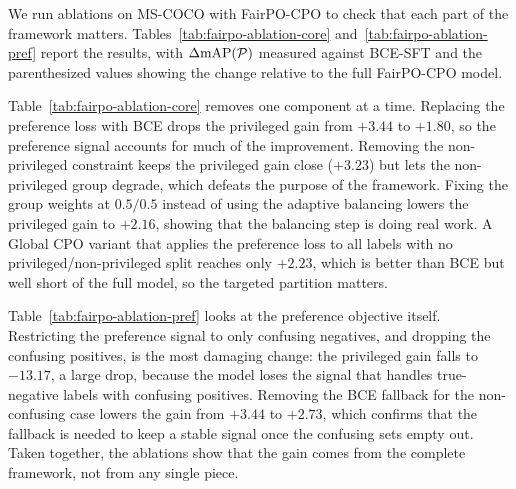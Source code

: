 We run ablations on MS-COCO with FairPO-CPO to check that each part of the framework
matters. Tables~\ref{tab:fairpo-ablation-core} and~\ref{tab:fairpo-ablation-pref}
report the results, with $\Delta\text{mAP}(\mathcal{P})$ measured against BCE-SFT and
the parenthesized values showing the change relative to the full FairPO-CPO model.

Table~\ref{tab:fairpo-ablation-core} removes one component at a time. Replacing the
preference loss with BCE drops the privileged gain from $+3.44$ to $+1.80$, so the
preference signal accounts for much of the improvement. Removing the non-privileged
constraint keeps the privileged gain close ($+3.23$) but lets the non-privileged
group degrade, which defeats the purpose of the framework. Fixing the group weights
at $0.5/0.5$ instead of using the adaptive balancing lowers the privileged gain to
$+2.16$, showing that the balancing step is doing real work. A Global CPO variant
that applies the preference loss to all labels with no privileged/non-privileged
split reaches only $+2.23$, which is better than BCE but well short of the full
model, so the targeted partition matters.

Table~\ref{tab:fairpo-ablation-pref} looks at the preference objective itself.
Restricting the preference signal to only confusing negatives, and dropping the
confusing positives, is the most damaging change: the privileged gain falls to
$-13.17$, a large drop, because the model loses the signal that handles
true-negative labels with confusing positives. Removing the BCE fallback for the
non-confusing case lowers the gain from $+3.44$ to $+2.73$, which confirms that the
fallback is needed to keep a stable signal once the confusing sets empty out. Taken
together, the ablations show that the gain comes from the complete framework, not
from any single piece.

